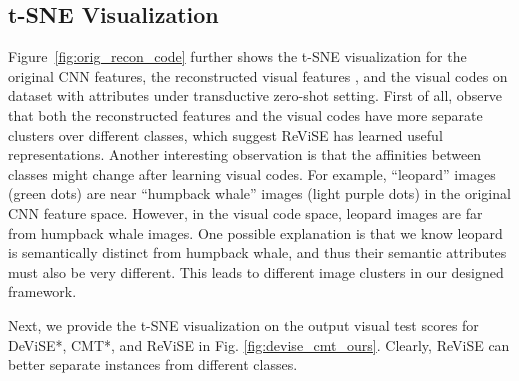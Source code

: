 {{}

\subsection{t-SNE Visualization}
\label{subsec:tsne}
{

Figure~\ref{fig:orig_recon_code} further shows the t-SNE \cite{maaten2008visualizing} visualization for the original CNN features, the reconstructed visual features , and the visual codes  on  dataset with  attributes under transductive zero-shot setting. 
First of all, observe that both the reconstructed features and the visual codes have more separate clusters over different classes, which suggest ReViSE has learned useful representations. Another interesting observation is that the affinities between classes might change after learning visual codes. For example, ``leopard'' images (green dots) are near ``humpback whale'' images (light purple dots) in the original CNN feature space. However, in the visual code space, leopard images are far from humpback whale images. One possible explanation is that we know leopard is semantically distinct from humpback whale, and thus their semantic attributes must also be very different. This leads to different image clusters in our designed framework.

Next, we provide the t-SNE visualization on the output visual test scores  for DeViSE*, CMT*, and ReViSE in Fig. \ref{fig:devise_cmt_ours}. Clearly, ReViSE can better separate instances from different classes. 



}}
